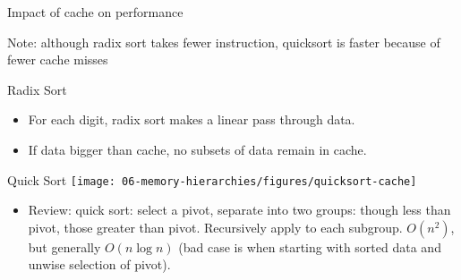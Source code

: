
        


\begin{frame}[fragile]
Impact of cache on performance
{\footnotesize
Note: although radix sort takes fewer instruction, quicksort is faster because of fewer cache misses


\begin{multicols}{2}
 Radix Sort
 \begin{itemize}
\item For each digit, radix sort makes a linear pass through data.
\item If data bigger than cache, no subsets of data remain in cache.
\end{itemize}

 \columnbreak

Quick Sort
	{\texttt{[image: 06-memory-hierarchies/figures/quicksort-cache]}}


\end{multicols}
}

\BNotes\ifnum{}
\begin{itemize}
    \item Review: quick sort: select a pivot, separate into two groups:
		though less than pivot, those greater than pivot.  Recursively
		apply to each subgroup.  $O(n^2)$, but generally $O(n\log n)$
		(bad case is when starting with sorted data and unwise selection
		 of pivot).


\end{itemize}
\end{frame}
